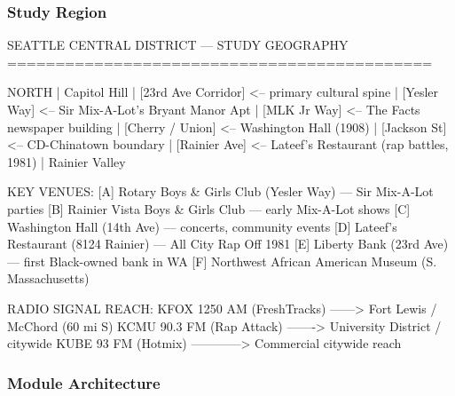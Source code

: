 \documentclass[11pt,letterpaper]{article}
\begin{document}
\subsubsection{Study Region}

\begin{asciibox}
SEATTLE CENTRAL DISTRICT — STUDY GEOGRAPHY
============================================

     NORTH
       |
  Capitol Hill
       |
  [23rd Ave Corridor] <-- primary cultural spine
       |
  [Yesler Way] <-- Sir Mix-A-Lot's Bryant Manor Apt
       |
  [MLK Jr Way] <-- The Facts newspaper building
       |
  [Cherry / Union] <-- Washington Hall (1908)
       |
  [Jackson St] <-- CD-Chinatown boundary
       |
  [Rainier Ave] <-- Lateef's Restaurant (rap battles, 1981)
       |
  Rainier Valley

  KEY VENUES:
  [A] Rotary Boys & Girls Club (Yesler Way) — Sir Mix-A-Lot parties
  [B] Rainier Vista Boys & Girls Club — early Mix-A-Lot shows
  [C] Washington Hall (14th Ave) — concerts, community events
  [D] Lateef's Restaurant (8124 Rainier) — All City Rap Off 1981
  [E] Liberty Bank (23rd Ave) — first Black-owned bank in WA
  [F] Northwest African American Museum (S. Massachusetts)

  RADIO SIGNAL REACH:
  KFOX 1250 AM (FreshTracks) ------> Fort Lewis / McChord (60 mi S)
  KCMU 90.3 FM (Rap Attack) -------> University District / citywide
  KUBE 93 FM (Hotmix) ------------> Commercial citywide reach
\end{asciibox}

\subsubsection{Module Architecture}
\end{document}
